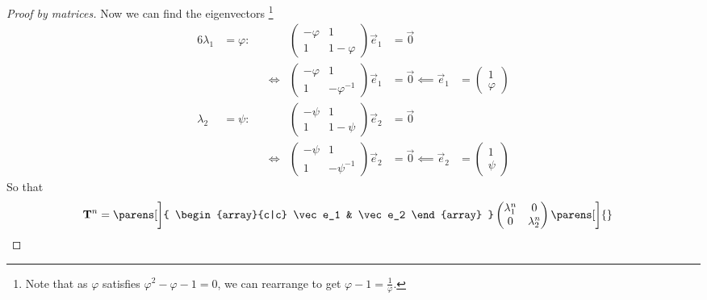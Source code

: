 \begin{proof}[Proof by matrices]
    Now we can find the eigenvectors \footnote{
        Note that as \(\varphi\) satisfies \(\varphi^2 - \varphi - 1 = 0\),
        we can rearrange to get \(\varphi - 1 = \frac 1\varphi\).}
    \begin{alignat*}6
        \lambda_1 &= \varphi:&
        &&
        \begin{pmatrix}
            -\varphi & 1 \\
            1 & 1 - \varphi
        \end{pmatrix} \vec e_1 &= \vec 0 \\
        && &\iff{}&
        \begin{pmatrix}
            -\varphi & 1 \\
            1 & -\varphi^{-1}
        \end{pmatrix} \vec e_1 &= \vec 0 \impliedby \vec e_1 &{}=
            \begin{pmatrix}
                1 \\
                \varphi
            \end{pmatrix} \\
        \lambda_2 &= \psi:&
        &&
        \begin{pmatrix}
            -\psi & 1 \\
            1 & 1 - \psi
        \end{pmatrix} \vec e_2 &= \vec 0 \\
        && &\iff{}&
        \begin{pmatrix}
            -\psi & 1 \\
            1 & -\psi^{-1}
        \end{pmatrix} \vec e_2 &= \vec 0 \impliedby \vec e_2 &{}=
            \begin{pmatrix}
                1 \\
                \psi
            \end{pmatrix}
    \end{alignat*}
    So that
    \begin{align*}
        \mat T^n &=
        \parens[\bigg]{
            \begin{array}{c|c}
                \vec e_1 & \vec e_2
            \end{array}
        }
        \begin{pmatrix}
            \lambda_1^n & 0 \\
            0 & \lambda_2^n
        \end{pmatrix}
        \parens[\bigg]{
            \begin{array}{c|c}

\end{array}}
\end{align*}
\end{proof}
